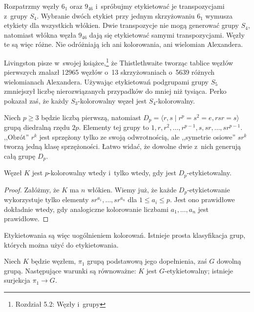 Rozpatrzmy węzły $6_1$ oraz $9_{46}$ i~spróbujmy etykietować je transpozycjami z~grupy $S_4$.
Wybranie dwóch etykiet przy jednym skrzyżowaniu $6_1$ wymusza etykiety dla wszystkich włókien.
Dwie transpozycje nie mogą generować grupy $S_4$, natomiast włókna węzła $9_{46}$ dają się etykietować samymi transpozycjami.
Węzły te są więc różne.
Nie odróżniają ich ani kolorowania, ani wielomian Alexandera.

Livingston pisze w~swojej książce,\footnote{Rozdział 5.2: Węzły i~grupy} że Thistlethwaite tworząc tablice węzłów pierwszych znalazł 12965 węzłów o~13 skrzyżowaniach o~5639 różnych wielomianach Alexandera.
Używając etykietowań podgrupami grupy $S_5$ zmniejszył liczbę nierozwiązanych przypadków do mniej niż tysiąca.
Perko pokazał zaś, że każdy $S_3$-kolorowalny węzeł jest $S_4$-kolorowalny.

Niech $p \ge 3$ będzie liczbą pierwszą, natomiast $D_p = \langle r, s \mid r^p = s^2 = e, rsr = s \rangle$ grupą diedralną rzędu $2p$.
Elementy tej grupy to $1, r, r^2, \ldots, r^{p-1}, s, sr, \ldots, sr^{p-1}$.
,,Obrót'' $r^k$ jest sprzężony tylko ze swoją odwrotnością, ale ,,symetrie osiowe'' $sr^k$ tworzą jedną klasę sprzężoności.
Łatwo widać, że dowolne dwie z~nich generują całą grupę $D_p$.

\begin{proposition}
	Węzeł $K$ jest $p$-kolorowalny wtedy i~tylko wtedy, gdy jest $D_p$-etykietowalny.
\end{proposition}

\begin{proof}
	Załóżmy, że $K$ ma $n$ włókien.
	Wiemy już, że każde $D_p$-etykietowanie wykorzystuje tylko elementy $sr^{a_1}, \ldots, sr^{a_n}$ dla $1 \le a_i \le p$.
	Jest ono prawidłowe dokładnie wtedy, gdy analogiczne kolorowanie liczbami $a_1, \ldots, a_n$ jest prawidłowe.
\end{proof}

Etykietowania są więc uogólnieniem kolorowań.
Istnieje prosta klasyfikacja grup, których można użyć do etykietowania.

\begin{proposition}
	Niech $K$ będzie węzłem, $\pi_1$ grupą podstawową jego dopełnienia, zaś $G$ dowolną grupą.
	Następujące warunki są równoważne: $K$ jest $G$-etykietowalny; istnieje surjekcja $\pi_1 \to G$.
\end{proposition}



